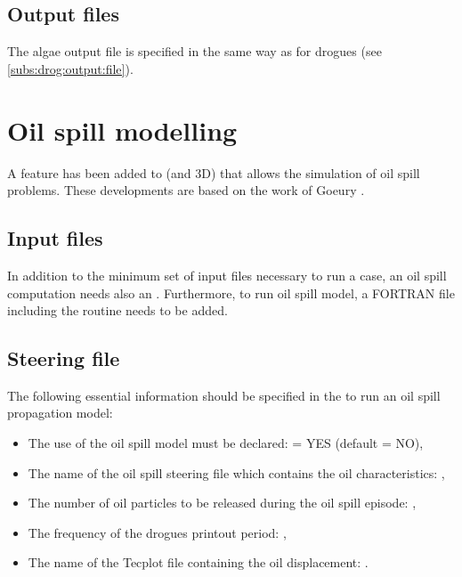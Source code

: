 \subsection{Output files}

The algae output file is specified in the same way as for drogues
(see \ref{subs:drog:output:file}).


\section{Oil spill modelling}
\label{sec:oil:spill:modell}
A feature has been added to  (and 3D) that allows the simulation
of oil spill problems.
These developments are based on the work of Goeury \cite{goeury2012}.


\subsection{Input files}

In addition to the minimum set of input files necessary to run a 
case, an oil spill computation needs also an .
Furthermore, to run oil spill model, a FORTRAN file including the routine
 needs to be added.


\subsection{Steering file}

The following essential information should be specified in the 
 to run an oil spill propagation model:

\begin{itemize}
\item The use of the oil spill model must be declared:
 = YES (default = NO),

\item The name of the oil spill steering file which contains the oil
characteristics: ,

\item The number of oil particles to be released during the oil spill episode:
\newline {},

\item The frequency of the drogues printout period:
,

\item The name of the Tecplot file containing the oil displacement:
.
\end{itemize}

